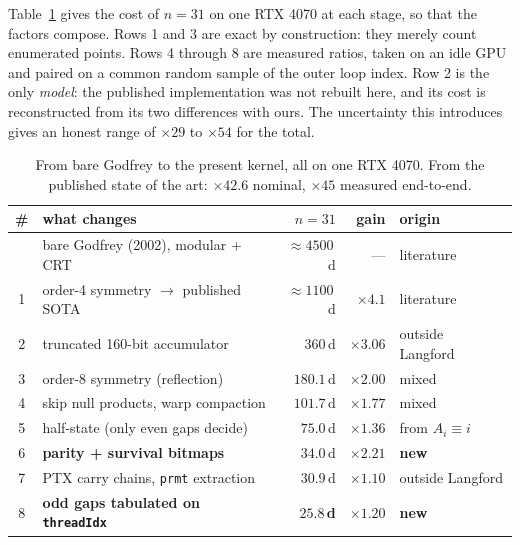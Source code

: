 \documentclass[11pt,a4paper]{article}
\begin{document}
Table~\ref{tab:chain} gives the cost of $n=31$ on one RTX 4070 at each stage, so
that the factors compose. Rows 1 and 3 are exact by construction: they merely
count enumerated points. Rows 4 through 8 are measured ratios, taken on an idle
GPU and paired on a common random sample of the outer loop index. Row 2 is the
only \emph{model}: the published implementation was not rebuilt here, and its
cost is reconstructed from its two differences with ours. The uncertainty this
introduces gives an honest range of $\times 29$ to $\times 54$ for the total.

\begin{table}[t]
\centering
\small
\begin{tabular}{@{}clrrl@{}}
\toprule
\# & what changes & $n{=}31$ & gain & origin \\
\midrule
   & bare Godfrey (2002), modular + CRT & ${\approx}4500$\,d & --- & literature \\
1 & order-4 symmetry $\rightarrow$ published SOTA & ${\approx}1100$\,d & $\times 4.1$ & literature~\cite{abl} \\
2 & truncated 160-bit accumulator & $360$\,d & $\times 3.06$ & outside Langford~\cite{taocp2} \\
3 & order-8 symmetry (reflection) & $180.1$\,d & $\times 2.00$ & mixed \\
4 & skip null products, warp compaction & $101.7$\,d & $\times 1.77$ & mixed~\cite{warp} \\
5 & half-state (only even gaps decide) & $75.0$\,d & $\times 1.36$ & from $A_i \equiv i$ \\
6 & \textbf{parity + survival bitmaps} & $34.0$\,d & $\times 2.21$ & \textbf{new} \\
7 & PTX carry chains, \texttt{prmt} extraction & $30.9$\,d & $\times 1.10$ & outside Langford \\
8 & \textbf{odd gaps tabulated on \texttt{threadIdx}} & $\mathbf{25.8}$\,\textbf{d} & $\times 1.20$ & \textbf{new} \\
\bottomrule
\end{tabular}
\caption{From bare Godfrey to the present kernel, all on one RTX 4070.
From the published state of the art: $\times 42.6$ nominal, $\times 45$ measured
end-to-end.}
\label{tab:chain}
\end{table}
\end{document}
